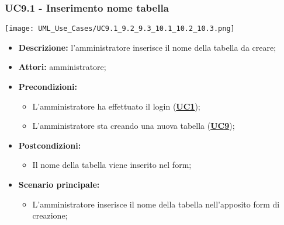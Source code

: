 \subsubsection{UC9.1 - Inserimento nome tabella}
\label{sec:UC9.1}
\texttt{[image: UML\_Use\_Cases/UC9.1\_9.2\_9.3\_10.1\_10.2\_10.3.png]}
\begin{itemize}
	\item \textbf{Descrizione:} l’amministratore inserisce il nome della tabella da creare;
	\item \textbf{Attori:} amministratore;
	\item \textbf{Precondizioni:} 
	\begin{itemize}
		\item L’amministratore ha effettuato il login (\hyperref[sec:UC1]{\textbf{UC1}});
		\item L’amministratore sta creando una nuova tabella (\hyperref[sec:UC9]{\textbf{UC9}});
	\end{itemize}
	\item \textbf{Postcondizioni:} 
	\begin{itemize}
		\item Il nome della tabella viene inserito nel form;
	\end{itemize}
	\item \textbf{Scenario principale:} 
	\begin{itemize}
		\item L’amministratore inserisce il nome della tabella nell'apposito form di creazione;
	\end{itemize}
\end{itemize}

